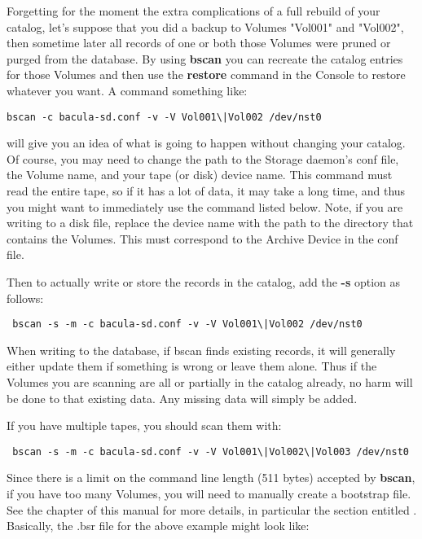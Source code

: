 Forgetting for the moment the extra complications of a full rebuild of
your catalog, let's suppose that you did a backup to Volumes "Vol001"
and "Vol002", then sometime later all records of one or both those
Volumes were pruned or purged from the
database. By using {\bf bscan} you can recreate the catalog entries for
those Volumes and then use the {\bf restore} command in the Console to restore
whatever you want. A command something like:

\footnotesize
\begin{verbatim}
bscan -c bacula-sd.conf -v -V Vol001\|Vol002 /dev/nst0
\end{verbatim}
\normalsize

will give you an idea of what is going to happen without changing
your catalog. Of course, you may need to change the path to the Storage
daemon's conf file, the Volume name, and your tape (or disk) device name. This
command must read the entire tape, so if it has a lot of data, it may take a
long time, and thus you might want to immediately use the command listed
below. Note, if you are writing to a disk file, replace the device name with
the path to the directory that contains the Volumes. This must correspond to
the Archive Device in the conf file.

Then to actually write or store the records in the catalog, add the {\bf -s}
option as follows:

\footnotesize
\begin{verbatim}
 bscan -s -m -c bacula-sd.conf -v -V Vol001\|Vol002 /dev/nst0
\end{verbatim}
\normalsize

When writing to the database, if bscan finds existing records, it will
generally either update them if something is wrong or leave them alone. Thus
if the Volumes you are scanning are all or partially in the catalog already, no
harm will be done to that existing data. Any missing data will simply be
added.

If you have multiple tapes, you should scan them with:

\footnotesize
\begin{verbatim}
 bscan -s -m -c bacula-sd.conf -v -V Vol001\|Vol002\|Vol003 /dev/nst0
\end{verbatim}
\normalsize

Since there is a limit on the command line length (511 bytes) accepted
by {\bf bscan}, if you have too many Volumes, you will need to manually
create a bootstrap file.  See the 
chapter of this manual for more details, in particular the section
entitled . Basically, the
.bsr file for the above example might look like:

